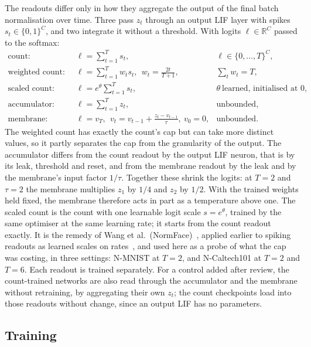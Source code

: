 \documentclass[10pt]{article}
\begin{document}
The readouts differ only in how they aggregate the output of the final batch normalisation over
time. Three pass $z_t$ through an output LIF layer with spikes $s_t\in\{0,1\}^C$, and two
integrate it without a threshold. With logits $\ell\in\mathbb{R}^C$ passed to the softmax:
\begin{align}
\text{count:}\quad & \ell=\textstyle\sum_{t=1}^{T} s_t, & \ell\in\{0,\dots,T\}^C,\\
\text{weighted count:}\quad & \ell=\textstyle\sum_{t=1}^{T} w_t s_t,\ \ w_t=\tfrac{2t}{T+1}, & \textstyle\sum_t w_t=T,\\
\text{scaled count:}\quad & \ell=e^{\theta}\textstyle\sum_{t=1}^{T} s_t, & \theta\ \text{learned, initialised at } 0,\\
\text{accumulator:}\quad & \ell=\textstyle\sum_{t=1}^{T} z_t, & \text{unbounded},\\
\text{membrane:}\quad & \ell=v_T,\ \ v_t=v_{t-1}+\tfrac{z_t-v_{t-1}}{\tau},\ v_0=0, & \text{unbounded}.
\end{align}
The weighted count has exactly the count's cap but can take more distinct values, so it
partly separates the cap from the granularity of the output. The accumulator differs from the
count readout by the output LIF neuron, that is by its leak, threshold and reset, and from the
membrane readout by the leak and by the membrane's input factor $1/\tau$. Together these shrink
the logits: at $T=2$ and $\tau=2$ the membrane multiplies $z_1$ by $1/4$ and $z_2$ by $1/2$. With
the trained weights held fixed, the membrane therefore acts in part as a temperature above one. The scaled
count is the count with one learnable logit scale $s=e^{\theta}$, trained by the same optimiser at
the same learning rate; it starts from the count readout exactly. It is the remedy of Wang et
al.\ (NormFace)~\citep{wang2017normface}, applied earlier to spiking readouts as learned scales
on rates~\citep{meng2022dsr,jurado2023spikemoid}, and used here as a probe of what the cap was costing, in three settings: %
N-MNIST at $T=2$, and N-Caltech101 at $T=2$ and $T=6$. Each readout is trained separately. For a
control added after review, the count-trained networks are also read through the accumulator and
the membrane without retraining, by aggregating their own $z_t$; the count checkpoints load into
those readouts without change, since an output LIF has no parameters.

\subsection{Training}
\label{sec:training}
\end{document}
